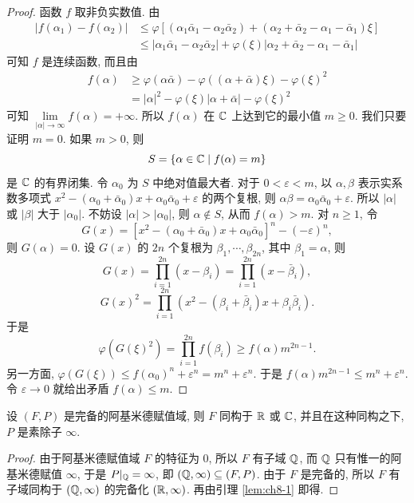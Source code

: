 \begin{proof}
函数 $f$ 取非负实数值. 由
\begin{align*}
  |f(\alpha_1)-f(\alpha_2)|&\leqslant\varphi\left[\left(\alpha_1\bar{\alpha}_1-\alpha_2\bar{\alpha}_2\right)
  +\left(\alpha_2+\bar{\alpha}_2-\alpha_1-\bar{\alpha}_1\right)\xi\right]\\
  &\leqslant\left|\alpha_1\bar{\alpha}_1-\alpha_2\bar{\alpha}_2\right|
  +\varphi(\xi)\left|\alpha_2+\bar{\alpha}_2-\alpha_1-\bar{\alpha}_1\right|
\end{align*}
可知 $f$ 是连续函数, 而且由
\begin{align*}
  f(\alpha)&\geqslant\varphi(\alpha\bar{\alpha})-\varphi\left((\alpha+\bar{\alpha})\xi\right)-\varphi(\xi)^2\\
  &=|\alpha|^2-\varphi(\xi)|\alpha+\bar{\alpha}|-\varphi(\xi)^2
\end{align*}
可知 $\lim\limits_{|\alpha|\to\infty}f(\alpha)=+\infty$. 所以 $f(\alpha)$ 在 $\mathbb{C}$ 上达到它的最小值 $m\geqslant 0$. 我们只要证明 $m=0$. 如果 $m>0$, 则
\[
  S=\{\alpha\in\mathbb{C}\mid f(\alpha)=m\}
\]
是 $\mathbb{C}$ 的有界闭集. 令 $\alpha_0$ 为 $S$ 中绝对值最大者. 对于 $0<\varepsilon<m$, 以 $\alpha,\beta$ 表示实系数多项式 $x^2-(\alpha_0+\bar{\alpha}_0)x+\alpha_0\bar{\alpha}_0+\varepsilon$ 的两个复根, 则 $\alpha\beta=\alpha_0\bar{\alpha}_0+\varepsilon$. 所以 $|\alpha|$ 或 $|\beta|$ 大于 $|\alpha_0|$. 不妨设 $|\alpha|>|\alpha_0|$, 则 $\alpha\notin S$, 从而 $f(\alpha)>m$. 对 $n\geqslant 1$, 令
\[
  G(x)=\left[x^2-(\alpha_0+\bar{\alpha}_0)x+\alpha_0\bar{\alpha}_0\right]^n-(-\varepsilon)^n,
\]
则 $G(\alpha)=0$. 设 $G(x)$ 的 $2n$ 个复根为 $\beta_1,\cdots,\beta_{2n}$, 其中 $\beta_1=\alpha$, 则
\[
  G(x)=\prod_{i=1}^{2n}(x-\beta_i)=\prod_{i=1}^{2n}(x-\bar{\beta}_i),
\]
\[
  G(x)^2=\prod_{i=1}^{2n}\left(x^2-(\beta_i+\bar{\beta}_i)x+\beta_i\bar{\beta}_i\right).
\]
于是
\[
  \varphi(G(\xi)^2)=\prod_{i=1}^{2n}f(\beta_i)\geqslant f(\alpha)m^{2n-1}.
\]
另一方面, $\varphi(G(\xi))\leqslant f(\alpha_0)^n+\varepsilon^n=m^n+\varepsilon^n$. 于是 $f(\alpha)m^{2n-1}\leqslant m^n+\varepsilon^n$. 令 $\varepsilon\to 0$ 就给出矛盾 $f(\alpha)\leqslant m$.
\end{proof}

\begin{theorem}\label{thm:8.3}
设 $(F,P)$ 是完备的阿基米德赋值域, 则 $F$ 同构于 $\mathbb{R}$ 或 $\mathbb{C}$, 并且在这种同构之下, $P$ 是素除子 $\infty$.
\end{theorem}

\begin{proof}
由于阿基米德赋值域 $F$ 的特征为 $0$, 所以 $F$ 有子域 $\mathbb{Q}$, 而 $\mathbb{Q}$ 只有惟一的阿基米德赋值 $\infty$, 于是 $P|_{\mathbb{Q}}=\infty$, 即 $(\mathbb{Q},\infty)\subseteq(F,P)$. 由于 $F$ 是完备的, 所以 $F$ 有子域同构于 $(\mathbb{Q},\infty)$ 的完备化 $(\mathbb{R},\infty)$. 再由引理 \ref{lem:ch8-1} 即得.
\end{proof}

